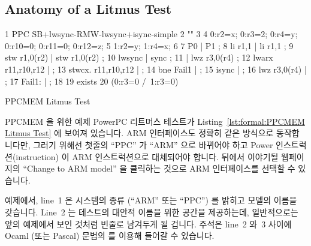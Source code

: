 \subsection{Anatomy of a Litmus Test}
\label{sec:formal:Anatomy of a Litmus Test}

\begin{listing}[tbp]
{ \scriptsize
\begin{verbbox}
 1 PPC SB+lwsync-RMW-lwsync+isync-simple
 2 ""
 3 {
 4 0:r2=x; 0:r3=2; 0:r4=y; 0:r10=0; 0:r11=0; 0:r12=z;
 5 1:r2=y; 1:r4=x;
 6 }
 7  P0                 | P1           ;
 8  li r1,1            | li r1,1      ;
 9  stw r1,0(r2)       | stw r1,0(r2) ;
10  lwsync             | sync         ;
11                     | lwz r3,0(r4) ;
12  lwarx  r11,r10,r12 | ;
13  stwcx. r11,r10,r12 | ;
14  bne Fail1          | ;
15  isync              | ;
16  lwz r3,0(r4)       | ;
17  Fail1:             | ;
18 
19 exists
20 (0:r3=0 /\ 1:r3=0)
\end{verbbox}
}
\centering
\theverbbox
\caption{PPCMEM Litmus Test}
\label{lst:formal:PPCMEM Litmus Test}
\end{listing}

PPCMEM 을 위한 예제 PowerPC 리트머스 테스트가
Listing~\ref{lst:formal:PPCMEM Litmus Test}
에 보여져 있습니다.
ARM 인터페이스도 정확히 같은 방식으로 동작합니다만, 그러기 위해선 첫줄의
``PPC'' 가 ``ARM'' 으로 바뀌어야 하고 Power 인스트럭션(instruction) 이 ARM
인스트럭션으로 대체되어야 합니다.
뒤에서 이야기될 웹페이지의 ``Change to ARM model'' 을 클릭하는 것으로 ARM
인터페이스를 선택할 수 있습니다.

예제에서, line~1 은 시스템의 종류 (``ARM'' 또는 ``PPC'') 를 밝히고 모델의
이름을 갖습니다.
Line~2 는 테스트의 대안적 이름을 위한 공간을 제공하는데, 일반적으로는 앞의
예제에서 보인 것처럼 빈줄로 남겨두게 될 겁니다.
주석은 line~2 와~3 사이에 Ocaml (또는 Pascal) 문법의 \nbco{(* *)} 를 이용해
들어갈 수 있습니다.
\iffalse

An example PowerPC litmus test for PPCMEM is shown in
Listing~\ref{lst:formal:PPCMEM Litmus Test}.
The ARM interface works exactly the same way, but with ARM instructions
substituted for the Power instructions and with the initial ``PPC''
replaced by ``ARM''. You can select the ARM interface by clicking on
``Change to ARM Model'' at the web page called out above.

In the example, line~1 identifies the type of system (``ARM'' or ``PPC'')
and contains the title for the model. Line~2 provides a place for an
alternative name for the test, which you will usually want to leave
blank as shown in the above example. Comments can be inserted between
lines~2 and~3 using the OCaml (or Pascal) syntax of \nbco{(* *)}.
\fi

